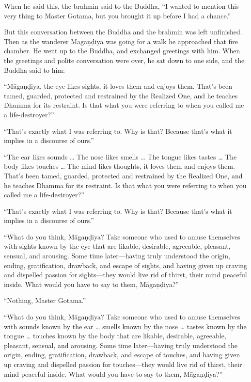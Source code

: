 \documentclass[12pt,openany]{book}%
\begin{document}
When he said this, the brahmin said to the Buddha, “I wanted to mention this very thing to Master Gotama, but you brought it up before I had a chance.” 

But this conversation between the Buddha and the brahmin was left unfinished. Then as the wanderer \textsanskrit{Māgaṇḍiya} was going for a walk he approached that fire chamber. He went up to the Buddha, and exchanged greetings with him. When the greetings and polite conversation were over, he sat down to one side, and the Buddha said to him: 

“\textsanskrit{Māgaṇḍiya}, the eye likes sights, it loves them and enjoys them. That’s been tamed, guarded, protected and restrained by the Realized One, and he teaches Dhamma for its restraint. Is that what you were referring to when you called me a life-destroyer?” 

“That’s exactly what I was referring to. Why is that? Because that’s what it implies in a discourse of ours.” 

“The ear likes sounds … The nose likes smells … The tongue likes tastes … The body likes touches … The mind likes thoughts, it loves them and enjoys them. That’s been tamed, guarded, protected and restrained by the Realized One, and he teaches Dhamma for its restraint. Is that what you were referring to when you called me a life-destroyer?” 

“That’s exactly what I was referring to. Why is that? Because that’s what it implies in a discourse of ours.” 

“What do you think, \textsanskrit{Māgaṇḍiya}? Take someone who used to amuse themselves with sights known by the eye that are likable, desirable, agreeable, pleasant, sensual, and arousing. Some time later—having truly understood the origin, ending, gratification, drawback, and escape of sights, and having given up craving and dispelled passion for sights—they would live rid of thirst, their mind peaceful inside. What would you have to say to them, \textsanskrit{Māgaṇḍiya}?” 

“Nothing, Master Gotama.” 

“What do you think, \textsanskrit{Māgaṇḍiya}? Take someone who used to amuse themselves with sounds known by the ear … smells known by the nose … tastes known by the tongue … touches known by the body that are likable, desirable, agreeable, pleasant, sensual, and arousing. Some time later—having truly understood the origin, ending, gratification, drawback, and escape of touches, and having given up craving and dispelled passion for touches—they would live rid of thirst, their mind peaceful inside. What would you have to say to them, \textsanskrit{Māgaṇḍiya}?” 
\end{document}
